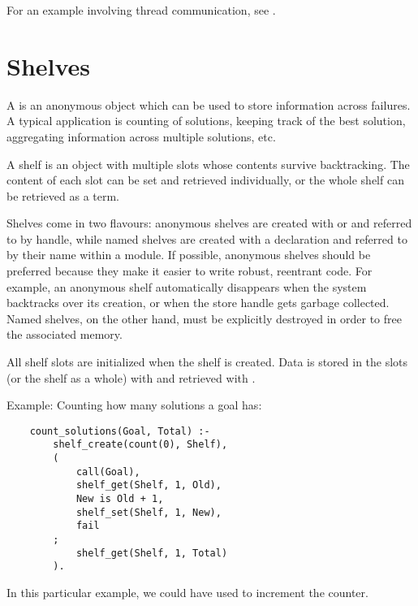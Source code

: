 For an example involving thread communication, see
.


\section{Shelves}

A  is an anonymous object which can be used to store information
across failures.  A typical application is counting of solutions,
keeping track of the best solution, aggregating information across
multiple solutions, etc.

A shelf is an object with multiple slots whose contents survive
backtracking.  The content of each slot can be set and retrieved
individually, or the whole shelf can be retrieved as a term.

Shelves come in two flavours:  anonymous shelves are created with
 or
and referred to by handle, while named shelves are created with a
declaration and referred to by their name within a module.
If possible, anonymous shelves should be preferred because they make it
easier to write robust, reentrant code.  For example, an anonymous shelf
automatically disappears when the system backtracks over its creation,
or when the store handle gets garbage collected.  Named shelves, on the
other hand, must be explicitly destroyed in order to free the
associated memory.

All shelf slots are initialized when the shelf is created.
Data is stored in the slots (or the shelf as a whole) with
and retrieved with
.

Example: Counting how many solutions a goal has:
\begin{verbatim}
    count_solutions(Goal, Total) :-
        shelf_create(count(0), Shelf),
        (
            call(Goal),
            shelf_get(Shelf, 1, Old),
            New is Old + 1,
            shelf_set(Shelf, 1, New),
            fail
        ;
            shelf_get(Shelf, 1, Total)
        ).
\end{verbatim}
In this particular example, we could have used
 to
increment the counter.


